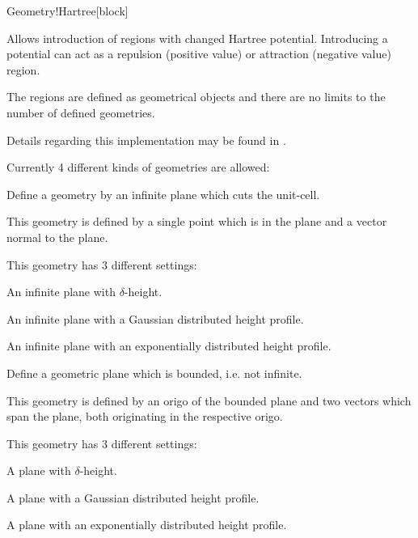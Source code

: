 \begin{fdfentry}{Geometry!Hartree}[block]%
  
  Allows introduction of regions with changed Hartree
  potential. Introducing a potential can act as a repulsion
  (positive value) or attraction (negative value) region.

  The regions are defined as geometrical objects and there are no
  limits to the number of defined geometries.

  Details regarding this implementation may be found in
  \citet{Papior2016a}.

  Currently 4 different kinds of geometries are allowed:
  \begin{fdfoptions}
    


    Define a geometry by an infinite plane which cuts the unit-cell.

    This geometry is defined by a single point which is in the plane
    and a vector normal to the plane.

    This geometry has 3 different settings:
    \begin{fdfoptions}
      \option[delta] %
      An infinite plane with $\delta$-height.

      \option[gauss] %
      An infinite plane with a Gaussian distributed height profile.

      \option[exp] %
      An infinite plane with an exponentially distributed height
      profile.

    \end{fdfoptions}



    Define a geometric plane which is bounded, i.e. not infinite.

    This geometry is defined by an origo of the bounded plane and two
    vectors which span the plane, both originating in the respective
    origo.

    This geometry has 3 different settings:
    \begin{fdfoptions}

      \option[delta] %
      A plane with $\delta$-height.

      \option[gauss] %
      A plane with a Gaussian distributed height profile.

      \option[exp] %
      A plane with an exponentially distributed height profile.


\end{fdfoptions}
\end{fdfoptions}
\end{fdfentry}
